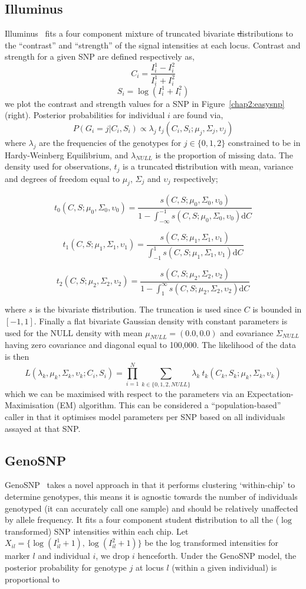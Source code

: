 \subsection{Illuminus}
Illuminus~\citep{Teo2007} fits a four component mixture of truncated bivariate \st distributions to the ``contrast'' and ``strength'' of the signal intensities at each locus.  Contrast and strength for a given SNP are defined respectively as,
$$C_{i} = \frac{I_i^1 - I_i^2}{I_i^1 + I_i^2}$$
$$S_{i} = \log(I_i^1 + I_i^2)$$
we plot the contrast and strength values for a SNP in Figure~\ref{chap2:easysnp}(right). Posterior probabilities for individual $i$ are found via,
$$P(G_i=j|C_i,S_i) \propto  \lambda_j~t_j(C_i,S_i;\mu_j,\Sigma_j,\upsilon_j)$$
where $\lambda_j$ are the frequencies of the genotypes for $j\in\{0,1,2\}$ constrained to be in Hardy-Weinberg Equilibrium, and $\lambda_{NULL}$ is the proportion of missing data. The density used for observations, $t_j$ is a truncated \st distribution with mean, variance and degrees of freedom equal to  $\mu_j$, $\Sigma_j$ and $\upsilon_j$ respectively;

$$t_0(C,S;\mu_0,\Sigma_0,\upsilon_0) = \frac{s(C,S;\mu_0,\Sigma_0,\upsilon_0)}{1-\int^{-1}_{-\infty} s(C,S;\mu_0,\Sigma_0,\upsilon_0) \textrm{d}C } $$

$$t_1(C,S;\mu_1,\Sigma_1,\upsilon_1) = \frac{s(C,S;\mu_1,\Sigma_1,\upsilon_1)}{\int^{1}_{-1} s(C,S;\mu_1,\Sigma_1,\upsilon_1) \textrm{d}C } $$

$$t_2(C,S;\mu_2,\Sigma_2,\upsilon_2) = \frac{s(C,S;\mu_2,\Sigma_2,\upsilon_2)}{1-\int_1^\infty s(C,S;\mu_2,\Sigma_2,\upsilon_2) \textrm{d}C } $$

where $s$ is the bivariate \st distribution. The truncation is used since $C$ is bounded in $[-1,1]$. Finally a flat bivariate Gaussian density with constant parameters is used for the NULL density with mean $\mu_{NULL}=(0.0,0.0)$ and covariance $\Sigma_{NULL}$ having zero covariance and diagonal equal to 100,000. The likelihood of the data is then
$$L (\lambda_k,\mu_k,\Sigma_k,\upsilon_k;C_{i},S_{i}) =  \prod_{i=1}^N  \sum_{k\in{\{0,1,2,NULL\}}} \lambda_k~t_k(C_{k},S_{k};\mu_k,\Sigma_k,\upsilon_k)$$ which we can be maximised with respect to the parameters via an Expectation-Maximisation (EM) algorithm.  This can be considered a ``population-based'' caller in that it optimises model parameters per SNP based on all individuals assayed at that SNP.

\subsection{GenoSNP}
GenoSNP~\citep{Giannoulatou2008} takes a novel approach in that it performs clustering `within-chip' to determine genotypes,  this means it is agnostic towards the number of individuals genotyped (it can accurately call one sample) and should be relatively unaffected by allele frequency.  It fits a four component student \st distribution to all the ($\log$ transformed) SNP intensities within each chip.  Let $X_{il}=\{\log(I^1_{il}+1),\log(I^2_{il}+1)\}$ be the log transformed intensities for marker $l$ and individual $i$, we drop $i$ henceforth.  Under the GenoSNP model, the posterior probability for genotype $j$ at locus $l$ (within a given individual) is proportional to

